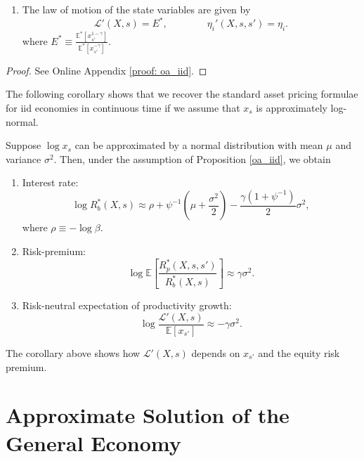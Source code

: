 \begin{proposition}
\begin{enumerate}
    \item The law of motion of the state variables are given by
    \begin{equation}
        \mathcal{L}'(X,s) = E^*, \qquad \qquad \eta_i'(X,s,s') = \eta_i.
    \end{equation}
    where $E^* \equiv \frac{\mathbb{E}^*[x_{s'}^{1-\gamma}]}{\mathbb{E}^*[x_{s'}^{-\gamma}]}$.
\end{enumerate}
\end{proposition}

\begin{proof}
See Online Appendix \ref{proof: oa_iid}.
\end{proof}



The following corollary shows that we recover the standard asset pricing formulae for iid economies in continuous time if we assume that $x_s$ is approximately log-normal.

\begin{corollary} Suppose $\log x_s$ can be approximated by a normal distribution with mean $\mu$ and variance $\sigma^2$. Then, under the assumption of Proposition \ref{oa_iid}, we obtain
\begin{enumerate}
    \item Interest rate:
\begin{equation}
    \log R_b^*(X,s) \approx \rho + \psi^{-1} \left( \mu + \frac{\sigma^2}{2} \right) - \frac{\gamma(1+\psi^{-1})}{2}  \sigma^2,
\end{equation}
where $\rho \equiv - \log \beta$. 

\item Risk-premium:
\begin{equation}
\log \mathbb{E}\left[\frac{R^*_p(X,s,s')}{R_b^*(X,s)} \right]  \approx \gamma \sigma^2.
\end{equation}

\item Risk-neutral expectation of productivity growth:
\begin{equation}
    \log \frac{\mathcal{L}'(X,s)}{\mathbb{E}[x_{s'}]} \approx -\gamma \sigma^2.
\end{equation}
\end{enumerate}

\end{corollary}

The corollary above shows how $\mathcal{L}'(X,s)$ depends on $x_{s'}$ and the equity risk premium. 

\section{Approximate Solution of the General Economy}

